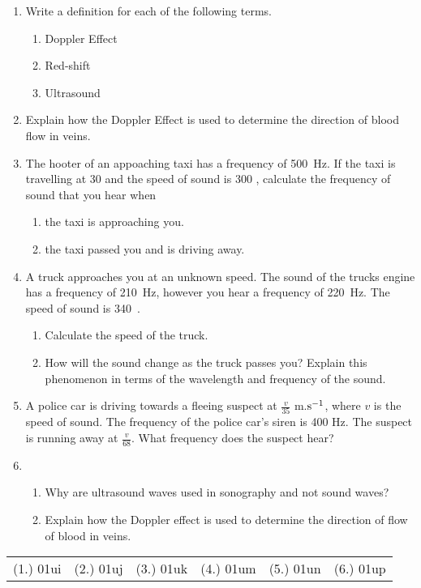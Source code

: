 \begin{eocexercises}{}
\begin{enumerate}
\item{Write a definition for each of the following terms.
\begin{enumerate}
\item Doppler Effect
\item Red-shift
\item Ultrasound
\end{enumerate}}
\item{Explain how the Doppler Effect is used to determine the direction of blood flow in veins.}
\item{The hooter of an appoaching taxi has a frequency of 500~Hz. If the taxi is travelling at 30 \ms and the speed of sound is 300 \ms, calculate the frequency of sound that you hear when 
\begin{enumerate}
\item the taxi is approaching you.
\item the taxi passed you and is driving away.
\end{enumerate}}
\item{A truck approaches you at an unknown speed. The sound of the trucks engine has a frequency of 210~Hz, however you hear a frequency of 220~Hz. The speed of sound is 340~\ms.
\begin{enumerate}
\item Calculate the speed of the truck.
\item How will the sound change as the truck passes you? Explain this phenomenon in terms of the wavelength and frequency of the sound.
\end{enumerate}}
\item{A police car is driving towards a fleeing suspect at $\frac{v}{35}$ m.$\rm{s^{-1}}$, where $v$ is the speed of sound. The frequency of the police car's siren is 400 Hz. The suspect is running away at $\frac{v}{68}$. What frequency does the suspect hear?}
\item{\begin{enumerate}
\item Why are ultrasound waves used in sonography and not sound waves?
\item Explain how the Doppler effect is used to determine the direction of flow of blood in veins.
\end{enumerate}}

\end{enumerate}


\par \practiceinfo
\par \begin{tabular}[h]{cccccc}
(1.)	01ui	&
(2.)	01uj	&
(3.)	01uk	&
(4.)	01um	&
(5.)	01un	&
(6.)	01up	\\ %
\end{tabular}
\end{eocexercises}




